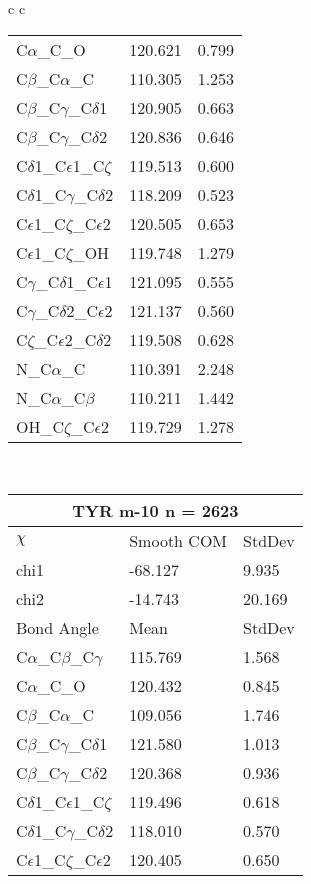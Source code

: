 \begin{longtable}{ c c }
\begin{tabular}{ l l l }
  C$\alpha$\_C\_O & 120.621 & 0.799\\
  C$\beta$\_C$\alpha$\_C & 110.305 & 1.253\\
  C$\beta$\_C$\gamma$\_C$\delta$1 & 120.905 & 0.663\\
  C$\beta$\_C$\gamma$\_C$\delta$2 & 120.836 & 0.646\\
  C$\delta$1\_C$\epsilon$1\_C$\zeta$ & 119.513 & 0.600\\
  C$\delta$1\_C$\gamma$\_C$\delta$2 & 118.209 & 0.523\\
  C$\epsilon$1\_C$\zeta$\_C$\epsilon$2 & 120.505 & 0.653\\
  C$\epsilon$1\_C$\zeta$\_OH & 119.748 & 1.279\\
  C$\gamma$\_C$\delta$1\_C$\epsilon$1 & 121.095 & 0.555\\
  C$\gamma$\_C$\delta$2\_C$\epsilon$2 & 121.137 & 0.560\\
  C$\zeta$\_C$\epsilon$2\_C$\delta$2 & 119.508 & 0.628\\
  N\_C$\alpha$\_C & 110.391 & 2.248\\
  N\_C$\alpha$\_C$\beta$ & 110.211 & 1.442\\
  OH\_C$\zeta$\_C$\epsilon$2 & 119.729 & 1.278\\
  \bottomrule
  \end{tabular}
  \\
  \begin{tabular}{ l l l }
  \toprule
  \multicolumn{3}{c}{TYR \textbf{m-10} n = 2623} \\ \toprule
  $\chi$       & Smooth COM & StdDev \\ \midrule
  chi1 & -68.127 & 9.935 \\ 
  chi2 & -14.743 & 20.169 \\ \midrule
  Bond Angle   & Mean     & StdDev \\ \midrule
  C$\alpha$\_C$\beta$\_C$\gamma$ & 115.769 & 1.568\\
  C$\alpha$\_C\_O & 120.432 & 0.845\\
  C$\beta$\_C$\alpha$\_C & 109.056 & 1.746\\
  C$\beta$\_C$\gamma$\_C$\delta$1 & 121.580 & 1.013\\
  C$\beta$\_C$\gamma$\_C$\delta$2 & 120.368 & 0.936\\
  C$\delta$1\_C$\epsilon$1\_C$\zeta$ & 119.496 & 0.618\\
  C$\delta$1\_C$\gamma$\_C$\delta$2 & 118.010 & 0.570\\
  C$\epsilon$1\_C$\zeta$\_C$\epsilon$2 & 120.405 & 0.650\\

\end{tabular}
\end{longtable}
